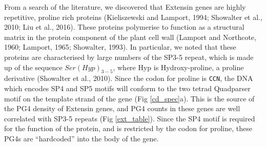 \documentclass[12pt,a4paper,]{report}
\let\origfigure=\figure
\let\endorigfigure=\endfigure
\renewenvironment{figure}[1][2] {
    \expandafter\origfigure\expandafter[H]
} {
    \endorigfigure
}
\begin{document}
\begin{figure}[htbp]
\end{figure}

\newpage

From a search of the literature, we discovered that Extensin genes are
highly repetitive, proline rich proteins (Kieliszewski and Lamport,
1994; Showalter et al., 2010; Liu et al., 2016). These proteins
polymerise to function as a structural matrix in the protein component
of the plant cell wall (Lamport and Northcote, 1960; Lamport, 1965;
Showalter, 1993). In particular, we noted that these proteins are
characterised by large numbers of the SP3-5 repeat, which is made up of
the sequence \(Ser(Hyp)_{3-5}\), where Hyp is Hydroxy-proline, a proline
derivative (Showalter et al., 2010). Since the codon for proline is
\texttt{CCN}, the DNA which encodes SP4 and SP5 motifs will conform to
the two tetrad Quadparser motif on the template strand of the gene (Fig
\ref{cd_spec}a). This is the source of the PG4 density of Extensin
genes, and PG4 counts in these genes are well correlated with SP3-5
repeats (Fig \ref{ext_table}). Since the SP4 motif is required for the
function of the protein, and is restricted by the codon for proline,
these PG4s are ``hardcoded'' into the body of the gene.

\newpage
\end{document}
